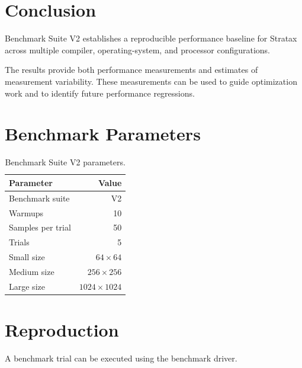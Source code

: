 \documentclass[11pt]{article}
\newcommand{\project}{Stratax}
\newcommand{\benchmarkversion}{V2}
\newcommand{\warmups}{10}
\newcommand{\samples}{50}
\newcommand{\trials}{5}
\begin{document}

\section{Conclusion}

Benchmark Suite \benchmarkversion{} establishes a reproducible
performance baseline for \project{} across multiple compiler,
operating-system, and processor configurations.

The results provide both performance measurements and estimates
of measurement variability. These measurements can be used to
guide optimization work and to identify future performance
regressions.



\appendix


\section{Benchmark Parameters}

\begin{table}[H]
    \centering

    \begin{tabular}{lr}
        \toprule
        \textbf{Parameter} & \textbf{Value} \\
        \midrule
        Benchmark suite & \benchmarkversion{} \\
        Warmups & \warmups{} \\
        Samples per trial & \samples{} \\
        Trials & \trials{} \\
        Small size & $64 \times 64$ \\
        Medium size & $256 \times 256$ \\
        Large size & $1024 \times 1024$ \\
        \bottomrule
    \end{tabular}

    \caption{Benchmark Suite \benchmarkversion{} parameters.}
\end{table}


\section{Reproduction}

A benchmark trial can be executed using the benchmark driver.
\end{document}
